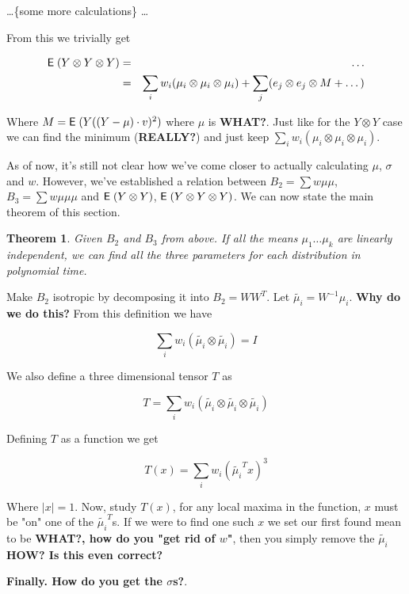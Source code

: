 \documentclass{book}
\newtheorem{theorem}{Theorem}[chapter]
\numberwithin{exercise}{chapter}
\begin{document}
\dots \{some more calculations\} \dots

From this we trivially get

\begin{eqnarray*}
  \hbox{{\sf E}\;}(Y \otimes Y \otimes Y)
  &=& \dots \\
  &=& \sum_i w_i (\mu_i \otimes \mu_i \otimes \mu_i)
   +  \sum_j (e_j \otimes e_j \otimes M + \dots)
\end{eqnarray*}

Where $M = \hbox{{\sf E}\;}(Y((Y-\mu) \cdot v)^2 )$ where $\mu$ is \textbf{WHAT?}. Just like
for the $Y \otimes Y$ case we can find the minimum (\textbf{REALLY?}) and just
keep $\sum_i w_i (\mu_i \otimes \mu_i \otimes \mu_i)$.

As of now, it's still not clear how we've come closer to actually calculating
$\mu$, $\sigma$ and $w$. However, we've established a relation between $B_2 =
\sum w \mu \mu$, $B_3 = \sum w \mu \mu \mu$ and $\hbox{{\sf E}\;}(Y \otimes Y)$, $\hbox{{\sf E}\;}(Y
\otimes Y \otimes Y)$. We can now state the main theorem of this section.

\begin{theorem}\label{thm:learnmix}
  Given $B_2$ and $B_3$ from above. If all the means $\mu_1 \dots \mu_k$ are
  linearly independent, we can find all the three parameters for each
  distribution in polynomial time.
\end{theorem}

Make $B_2$ isotropic by decomposing it into $B_2 = W W^T$. Let $\tilde{\mu_i} =
W^{-1} \mu_i$.  \textbf{Why do we do this?} From this definition we have

\[
  \sum_i w_i (\tilde{\mu_i} \otimes \tilde{\mu_i}) = I
\]

We also define a three dimensional tensor $T$ as

\[
  T = \sum_i w_i (\tilde{\mu_i} \otimes \tilde{\mu_i} \otimes \tilde{\mu_i} )
\]

Defining $T$ as a function we get

\[
  T(x) = \sum_i w_i (\tilde{\mu_i}^T x)^3
\]

Where $|x| = 1$. Now, study $T(x)$, for any local maxima in the function, $x$
must be "on" one of the $\tilde{\mu_i}^T$s. If we were to find one such $x$ we
set our first found mean to be \textbf{WHAT?, how do you "get rid of $w$"}, then
you simply remove the $\tilde{\mu_i}$ \textbf{HOW? Is this even correct?}

\textbf{Finally. How do you get the $\sigma$s?}.
\end{document}
